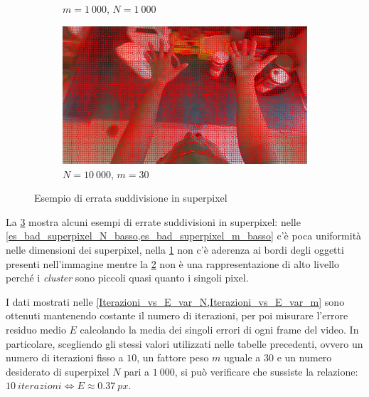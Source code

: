 \documentclass[12pt,a4paper,oneside]{article}
\begin{document}
\begin{figure}[p]
\begin{subfigure}[t]{.495\textwidth}
		\caption{$m = 1~000$, $N = 1~000$}\label{es_bad_superpixel_m_alto}
	\end{subfigure}%
	\hfill
	\begin{subfigure}[t]{.495\textwidth}
		\includegraphics[width=\textwidth]{resources/images/N_alto_10000.png}
		\caption{$N = 10~000$, $m = 30$}\label{es_bad_superpixel_N_alto}
	\end{subfigure}%
	\caption{Esempio di errata suddivisione in superpixel}\label{es_bad_superpixel}
\end{figure}

\noindent La \cref{es_bad_superpixel} mostra alcuni esempi di errate suddivisioni in superpixel: nelle \cref{es_bad_superpixel_N_basso,es_bad_superpixel_m_basso} c'è poca uniformità nelle dimensioni dei superpixel, nella \cref{es_bad_superpixel_m_alto} non c'è aderenza ai bordi degli oggetti presenti nell'immagine mentre la \cref{es_bad_superpixel_N_alto} non è una rappresentazione di alto livello perché i \textit{cluster} sono piccoli quasi quanto i singoli pixel.

I dati mostrati nelle \cref{Iterazioni_vs_E_var_N,Iterazioni_vs_E_var_m} sono ottenuti mantenendo costante il numero di iterazioni, per poi misurare l'errore residuo medio $E$ calcolando la media dei singoli errori di ogni frame del video. In particolare, scegliendo gli stessi valori utilizzati nelle tabelle precedenti, ovvero un numero di iterazioni fisso a $10$, un fattore peso $m$ uguale a $30$ e un numero desiderato di superpixel $N$ pari a $1~000$, si può verificare che sussiste la relazione: $10~iterazioni \Leftrightarrow E \approx 0.37~px$.
\end{document}
